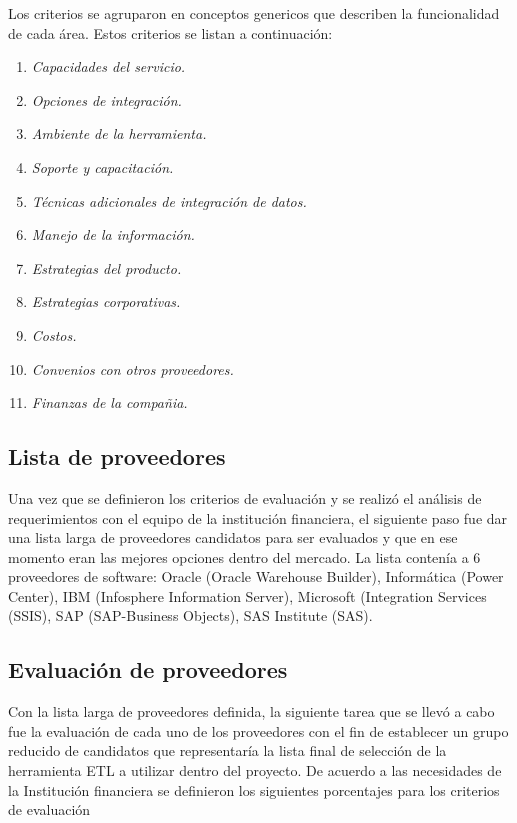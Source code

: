 Los criterios se agruparon en conceptos genericos que describen la funcionalidad
de cada área. Estos criterios se listan a continuación:

\begin{enumerate}
\item \textit{Capacidades del servicio.}
\item \textit{Opciones de integración.}
\item \textit{Ambiente de la herramienta.}
\item \textit{Soporte y capacitación.}
\item \textit{Técnicas adicionales de integración de datos.}
\item \textit{Manejo de la información.}
\item \textit{Estrategias del producto.}
\item \textit{Estrategias corporativas.}
\item \textit{Costos.}
\item \textit{Convenios con otros proveedores.}
\item \textit{Finanzas de la compañia.}
\end{enumerate}

\subsection{Lista de proveedores}

Una vez que se definieron los criterios de evaluación y se realizó el análisis
de requerimientos con el equipo de la institución financiera, el siguiente paso
fue dar una lista larga de proveedores candidatos para ser evaluados y que en
ese momento eran las mejores opciones dentro del mercado. La lista contenía a 6
proveedores de software: Oracle (Oracle Warehouse Builder), Informática (Power
Center), IBM (Infosphere Information Server), Microsoft (Integration Services
(SSIS), SAP (SAP-Business Objects), SAS Institute (SAS).

\subsection{Evaluación de proveedores}

Con la lista larga de proveedores definida, la siguiente tarea que se llevó a
cabo fue la evaluación de cada uno de los proveedores con el fin de establecer
un grupo reducido de candidatos que representaría la lista final de selección de
la herramienta ETL a utilizar dentro del proyecto. De acuerdo a las necesidades
de la Institución financiera se definieron los siguientes porcentajes para los
criterios de evaluación


